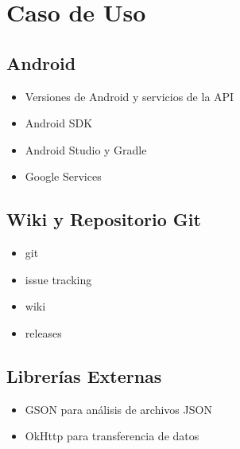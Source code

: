 \chapter{Caso de Uso}

\section{Android}
\begin{itemize}
	\item Versiones de Android y servicios de la API
	\item Android SDK
	\item Android Studio y Gradle
	\item Google Services
\end{itemize}	

\section{Wiki y Repositorio Git}
\begin{itemize}
	\item git
	\item issue tracking 
	\item wiki
	\item releases
\end{itemize}	

\section{Librerías Externas}
\begin{itemize}
	\item GSON para análisis de archivos JSON
	\item OkHttp para transferencia de datos
\end{itemize}	


